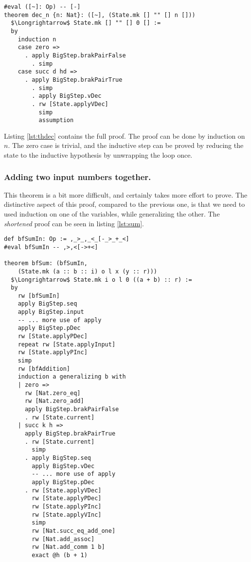 \documentclass[runningheads]{llncs}
\newcommand{\cc}{\lstinline[mathescape]}
\begin{document}
\vspace{2mm}
\begin{lstlisting}[mathescape, label=lst:thdec, 
    caption={Proof by induction in Lean, that \cc{[-]} reduces a cell to 0}]
#eval ([~]: Op) -- [-]
theorem dec_n {n: Nat}: ([~], (State.mk [] "" [] n []))
  $\Longrightarrow$ State.mk [] "" [] 0 [] :=
  by
    induction n
    case zero =>
      . apply BigStep.brakPairFalse
        . simp
    case succ d hd =>
      . apply BigStep.brakPairTrue
        . simp
        . apply BigStep.vDec
        . rw [State.applyVDec]
          simp
          assumption
\end{lstlisting}

Listing \ref{lst:thdec} contains the full proof. The proof can be done by
induction on $n$. The zero case is trivial, and the inductive step can be 
proved by reducing the state to the inductive hypothesis by unwrapping the
loop once.

\vspace{-3mm}
\subsubsection{Adding two input numbers together.}

This theorem is a bit more difficult, and certainly takes more effort to prove.
The distinctive aspect of this proof, compared to the previous one, is that we
need to used induction on one of the variables, while generalizing the other.
The \emph{shortened} proof can be seen in listing \ref{lst:sum}.

\vspace{2mm}
\begin{lstlisting}[mathescape, label=lst:sum,
    caption={Proof in Lean that
    the algorithm \cc{,>,<[->+<]} takes to numbers from the input and computes
    their sum.}]
def bfSumIn: Op := ,_>_,_<_[-_>_+_<]
#eval bfSumIn -- ,>,<[->+<]

theorem bfSum: (bfSumIn,
    (State.mk (a :: b :: i) o l x (y :: r)))
  $\Longrightarrow$ State.mk i o l 0 ((a + b) :: r) := 
  by 
    rw [bfSumIn]
    apply BigStep.seq
    apply BigStep.input
    -- ... more use of apply
    apply BigStep.pDec
    rw [State.applyPDec]
    repeat rw [State.applyInput]
    rw [State.applyPInc]
    simp
    rw [bfAddition]
    induction a generalizing b with
    | zero =>
      rw [Nat.zero_eq]
      rw [Nat.zero_add]
      apply BigStep.brakPairFalse
      . rw [State.current]
    | succ k h =>
      apply BigStep.brakPairTrue
      . rw [State.current]
        simp
      . apply BigStep.seq
        apply BigStep.vDec
        -- ... more use of apply
        apply BigStep.pDec
      . rw [State.applyVDec]
        rw [State.applyPDec]
        rw [State.applyPInc]
        rw [State.applyVInc]
        simp
        rw [Nat.succ_eq_add_one]
        rw [Nat.add_assoc]
        rw [Nat.add_comm 1 b]
        exact @h (b + 1)
\end{lstlisting}
\end{document}
